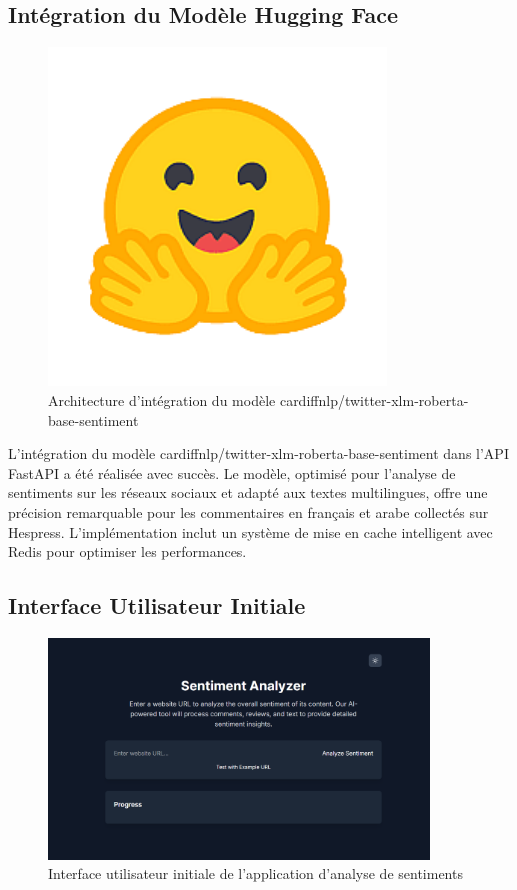 \subsection{Intégration du Modèle Hugging Face}

\begin{figure}[H]
\centering
\includegraphics[width=0.8\textwidth]{assets/images/face.png}
\caption{Architecture d'intégration du modèle cardiffnlp/twitter-xlm-roberta-base-sentiment}
\label{fig:huggingface-integration}
\end{figure}

L'intégration du modèle cardiffnlp/twitter-xlm-roberta-base-sentiment dans l'API FastAPI a été réalisée avec succès. Le modèle, optimisé pour l'analyse de sentiments sur les réseaux sociaux et adapté aux textes multilingues, offre une précision remarquable pour les commentaires en français et arabe collectés sur Hespress. L'implémentation inclut un système de mise en cache intelligent avec Redis pour optimiser les performances.

\subsection{Interface Utilisateur Initiale}

\begin{figure}[H]
\centering
\includegraphics[width=0.9\textwidth]{assets/images/init-ui.png}
\caption{Interface utilisateur initiale de l'application d'analyse de sentiments}
\label{fig:initial-ui}
\end{figure}

